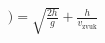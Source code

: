 \documentclass[preview]{standalone}
\begin{document}
\begin{align*}
) = \sqrt{\frac{2h}{g}} + \frac{h}{v_{\text{zvuk}}}
\end{align*}
\end{document}
